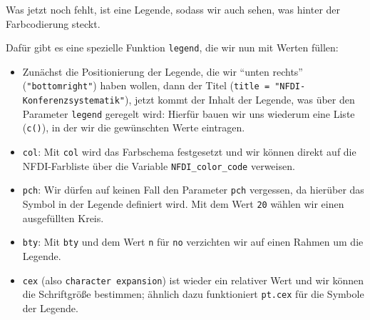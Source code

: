 \documentclass[11pt]{article}
\providecommand{\tightlist}{%
      \setlength{\itemsep}{0pt}\setlength{\parskip}{0pt}}
\begin{document}
Was jetzt noch fehlt, ist eine Legende, sodass wir auch sehen, was
hinter der Farbcodierung steckt.

    Dafür gibt es eine spezielle Funktion \texttt{legend}, die wir nun mit
Werten füllen:

\begin{itemize}
\tightlist
\item
  Zunächst die Positionierung der Legende, die wir ``unten rechts''
  (\texttt{"bottomright"}) haben wollen, dann der Titel
  (\texttt{title\ =\ "NFDI-Konferenzsystematik"}), jetzt kommt der
  Inhalt der Legende, was über den Parameter \texttt{legend} geregelt
  wird: Hierfür bauen wir uns wiederum eine Liste (\texttt{c()}), in der
  wir die gewünschten Werte eintragen.
\item
  \texttt{col}: Mit \texttt{col} wird das Farbschema festgesetzt und wir
  können direkt auf die NFDI-Farbliste über die Variable
  \texttt{NFDI\_color\_code} verweisen.
\item
  \texttt{pch}: Wir dürfen auf keinen Fall den Parameter \texttt{pch}
  vergessen, da hierüber das Symbol in der Legende definiert wird. Mit
  dem Wert \texttt{20} wählen wir einen ausgefüllten Kreis.
\item
  \texttt{bty}: Mit \texttt{bty} und dem Wert \texttt{n} für \texttt{no}
  verzichten wir auf einen Rahmen um die Legende.
\item
  \texttt{cex} (also \texttt{character\ expansion}) ist wieder ein
  relativer Wert und wir können die Schriftgröße bestimmen; ähnlich dazu
  funktioniert \texttt{pt.cex} für die Symbole der Legende.
\end{itemize}

    \begin{tcolorbox}[breakable, size=fbox, boxrule=1pt, pad at break*=1mm,colback=cellbackground, colframe=cellborder]
\begin{Verbatim}[commandchars=\\\{\}]

\end{Verbatim}
\end{tcolorbox}
\end{document}
